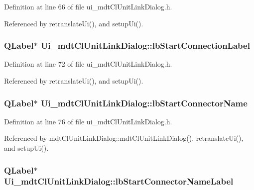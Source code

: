 Definition at line 66 of file ui\-\_\-mdt\-Cl\-Unit\-Link\-Dialog.\-h.



Referenced by retranslate\-Ui(), and setup\-Ui().

\hypertarget{class_ui__mdt_cl_unit_link_dialog_aeba7f4367ee88356d7e0813a96ead4b8}{
\subsubsection[{lb\-Start\-Connection\-Label}]{\setlength{\rightskip}{0pt plus 5cm}Q\-Label$\ast$ Ui\-\_\-mdt\-Cl\-Unit\-Link\-Dialog\-::lb\-Start\-Connection\-Label}}\label{class_ui__mdt_cl_unit_link_dialog_aeba7f4367ee88356d7e0813a96ead4b8}


Definition at line 72 of file ui\-\_\-mdt\-Cl\-Unit\-Link\-Dialog.\-h.



Referenced by retranslate\-Ui(), and setup\-Ui().

\hypertarget{class_ui__mdt_cl_unit_link_dialog_aec7e5b510093d38360ec876841994d43}{
\subsubsection[{lb\-Start\-Connector\-Name}]{\setlength{\rightskip}{0pt plus 5cm}Q\-Label$\ast$ Ui\-\_\-mdt\-Cl\-Unit\-Link\-Dialog\-::lb\-Start\-Connector\-Name}}\label{class_ui__mdt_cl_unit_link_dialog_aec7e5b510093d38360ec876841994d43}


Definition at line 76 of file ui\-\_\-mdt\-Cl\-Unit\-Link\-Dialog.\-h.



Referenced by mdt\-Cl\-Unit\-Link\-Dialog\-::mdt\-Cl\-Unit\-Link\-Dialog(), retranslate\-Ui(), and setup\-Ui().

\hypertarget{class_ui__mdt_cl_unit_link_dialog_a9219d9d5d753c3f26563b414731af03c}{
\subsubsection[{lb\-Start\-Connector\-Name\-Label}]{\setlength{\rightskip}{0pt plus 5cm}Q\-Label$\ast$ Ui\-\_\-mdt\-Cl\-Unit\-Link\-Dialog\-::lb\-Start\-Connector\-Name\-Label}}\label{class_ui__mdt_cl_unit_link_dialog_a9219d9d5d753c3f26563b414731af03c}


